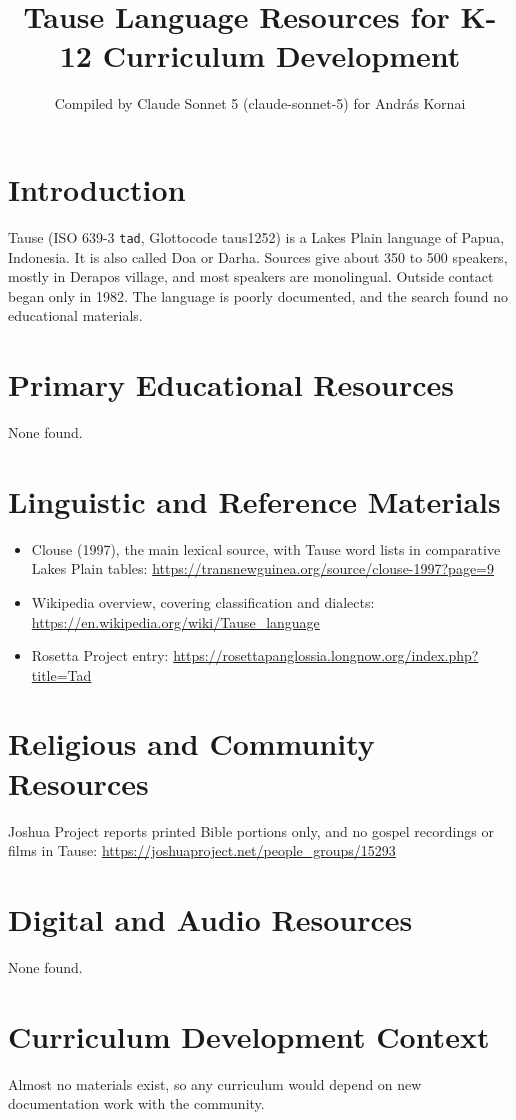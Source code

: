 \documentclass[12pt]{article}
\title{Tause Language Resources for K-12 Curriculum Development}
\author{Compiled by Claude Sonnet 5 (claude-sonnet-5) for Andr\'as Kornai}
\date{}
\begin{document}
\maketitle

\section{Introduction}
Tause (ISO 639-3 \texttt{tad}, Glottocode taus1252) is a Lakes Plain language of Papua, Indonesia. It is also called Doa or Darha. Sources give about 350 to 500 speakers, mostly in Derapos village, and most speakers are monolingual. Outside contact began only in 1982. The language is poorly documented, and the search found no educational materials.

\section{Primary Educational Resources}
None found.

\section{Linguistic and Reference Materials}
\begin{itemize}
\item Clouse (1997), the main lexical source, with Tause word lists in comparative Lakes Plain tables: \url{https://transnewguinea.org/source/clouse-1997?page=9}
\item Wikipedia overview, covering classification and dialects: \url{https://en.wikipedia.org/wiki/Tause_language}
\item Rosetta Project entry: \url{https://rosettapanglossia.longnow.org/index.php?title=Tad}
\end{itemize}

\section{Religious and Community Resources}
Joshua Project reports printed Bible portions only, and no gospel recordings or films in Tause: \url{https://joshuaproject.net/people_groups/15293}

\section{Digital and Audio Resources}
None found.

\section{Curriculum Development Context}
Almost no materials exist, so any curriculum would depend on new documentation work with the community.
\end{document}
